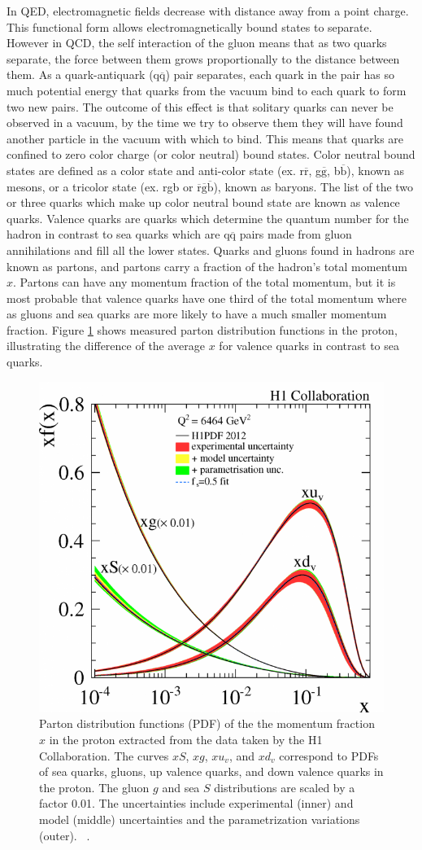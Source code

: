 In QED, electromagnetic fields decrease with distance away from a point charge. This functional form allows electromagnetically bound states to separate.
However in QCD, the self interaction of the gluon means that as two quarks separate, the force between them grows proportionally to the distance between them. As a
quark-antiquark (q$\overline{\text{q}}$) pair separates, each quark in the pair has so much potential energy that quarks from the vacuum bind to each quark to form two new pairs. The outcome of this effect is that solitary quarks can never be observed in a vacuum, by the time we try to observe them they will have found another particle in the vacuum with which to bind. This means that quarks are confined to zero color charge (or color neutral) bound states. Color neutral bound states are defined as a color state and anti-color state  (ex. r$\overline{\text{r}}$, g$\overline{\text{g}}$, b$\overline{\text{b}}$),  known as mesons, or a tricolor state (ex. rgb or $\overline{\text{r}}\overline{\text{g}}\overline{\text{b}}$), known as baryons. The list of the two or three quarks which make up color neutral bound state are known as valence quarks. Valence quarks are quarks which determine the quantum number for the hadron in contrast to sea quarks which are q$\overline{\text{q}}$ pairs made from gluon annihilations and fill all the lower states. Quarks and gluons found in hadrons are known as partons, and partons carry a fraction of the hadron's total momentum $x$. Partons can have any momentum fraction of the total momentum, but it is most probable that valence quarks have one third of the total momentum where as gluons and sea quarks are more likely to have a much smaller momentum fraction. Figure \ref{fig:pdf_plot} shows measured parton distribution functions in the proton, illustrating the difference of the average $x$ for valence quarks in contrast to sea quarks.

\begin{figure}[!ht]
\begin{center}
\includegraphics[width=0.45\linewidth]{figs/parton_distribution.png}
\caption{Parton distribution functions (PDF) of the the momentum fraction $x$ in the proton extracted from the data taken by the H1 Collaboration. The curves $xS$, $xg$, $xu_v$, and $xd_v$ correspond to PDFs of sea quarks, gluons, up valence quarks, and down valence quarks in the proton. The gluon $g$ and sea $S$ distributions are scaled by a factor 0.01. The uncertainties include experimental (inner) and model (middle) uncertainties and the parametrization variations (outer). ~\cite{Aaron2012}.}
\end{center}
\label{fig:pdf_plot}
\end{figure}

